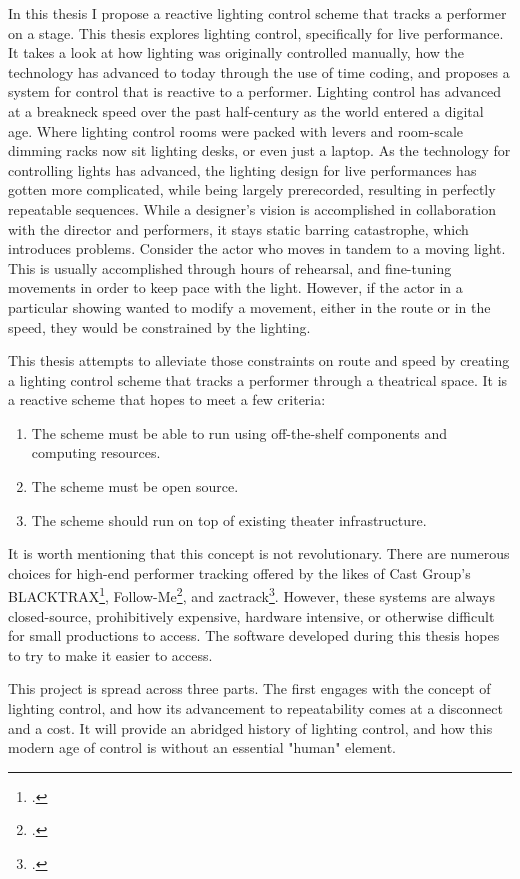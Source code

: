 \documentclass[
    12pt,
    twoside,
    bibstyle=chicago,
    headerstyle=uppercase,
	bibfile=biblatex_updating.bib
]{reedthesis}
\begin{document}
In this thesis I propose a reactive lighting control scheme that tracks a performer on a stage. This thesis explores lighting control, specifically for live performance. It takes a look at how lighting was originally controlled manually, how the technology has advanced to today through the use of time coding, and proposes a system for control that is reactive to a performer. Lighting control has advanced at a breakneck speed over the past half-century as the world entered a digital age. Where lighting control rooms were packed with levers and room-scale dimming racks now sit lighting desks, or even just a laptop. As the technology for controlling lights has advanced, the lighting design for live performances has gotten more complicated, while being largely prerecorded, resulting in perfectly repeatable sequences.  While a designer's vision is accomplished in collaboration with the director and performers, it stays static barring catastrophe, which introduces problems. Consider the actor who moves in tandem to a moving light. This is usually accomplished through hours of rehearsal, and fine-tuning movements in order to keep pace with the light. However, if the actor in a particular showing wanted to modify a movement, either in the route or in the speed, they would be constrained by the lighting.


This thesis attempts to alleviate those constraints on route and speed by creating a lighting control scheme that tracks a performer through a theatrical space. It is a reactive scheme that hopes to meet a few criteria: 
\begin{enumerate}
	\item The scheme must be able to run using off-the-shelf components and computing resources.
	\item The scheme must be open source.
	\item The scheme should run on top of existing theater infrastructure.
\end{enumerate}It is worth mentioning that this concept is not revolutionary. There are numerous choices for high-end performer tracking offered by the likes of Cast Group's BLACKTRAX\footcite{BlackTraxCASTGroup2025}, Follow-Me\footcite{HomeFollowMe2025}, and zactrack\footcite{AutomatedFollowSystem2025}. However, these systems are always closed-source, prohibitively expensive, hardware intensive, or otherwise difficult for small productions to access. The software developed during this thesis hopes to try to make it easier to access.

This project is spread across three parts. The first engages with the concept of lighting control, and how its advancement to repeatability comes at a disconnect and a cost. It will provide an abridged history of lighting control, and how this modern age of control is without an essential "human" element.
\end{document}
